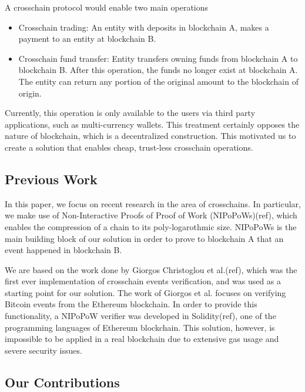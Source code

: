 \documentclass{article}
\begin{document}
  A crosschain protocol would enable two main operations
  \begin{itemize}
  \item
    Crosschain trading: An entity with deposits in blockchain A, makes a
    payment to an entity at blockchain B.
  \item
    Crosschain fund transfer: Entity transfers owning funds from
    blockchain A to blockchain B. After this operation, the funds no
    longer exist at blockchain A. The entity can return any portion of
    the original amount to the blockchain of origin.
  \end{itemize}

  Currently, this operation is only available to the users via third
  party applications, such as multi-currency wallets. This treatment
  certainly opposes the nature of blockchain, which is a decentralized
  construction. This motivated us to create a solution that enables
  cheap, trust-less crosschain operations.

  \subsection{Previous Work}

  In this paper, we focus on recent research in the area of crosschains.
  In particular, we make use of Non-Interactive Proofs of Proof of Work
  (NIPoPoWs)(ref), which enables the compression of a chain to its
  poly-logarothmic size. NIPoPoWs is the main building block of our
  solution in order to prove to blockchain A that an event happened in
  blockchain B.

  We are based on the work done by Giorgos Christoglou et al.(ref),
  which was the first ever implementation of crosschain events
  verification, and was used as a starting point for our solution. The
  work of Giorgos et al. focuses on verifying Bitcoin events from the
  Ethereum blockchain. In order to provide this functionality, a NIPoPoW
  verifier was developed in Solidity(ref), one of the programming
  languages of Ethereum blockchain. This solution, however, is
  impossible to be applied in a real blockchain due to extensive gas
  usage and severe security issues.

  \subsection{Our Contributions}
\end{document}
